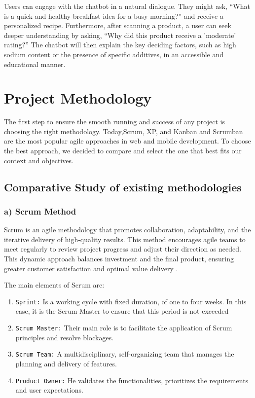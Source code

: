 Users can engage with the chatbot in a natural dialogue. They might ask, “What is a quick and healthy breakfast idea for a busy morning?” and receive a personalized recipe. Furthermore, after scanning a product, a user can seek deeper understanding by asking, “Why did this product receive a 'moderate' rating?” The chatbot will then explain the key deciding factors, such as high sodium content or the presence of specific additives, in an accessible and educational manner.


\section{Project Methodology}

The first step to ensure the smooth running and success of any project is choosing the right methodology. Today,Scrum, XP, and Kanban and  Scrumban are the most popular agile approaches in web and mobile development.
To choose the best approach, we decided to compare and select the one that best fits our context and objectives.

\subsection{Comparative Study of existing methodologies}
\subsubsection{a) Scrum Method} 
Scrum is an agile methodology that promotes collaboration, adaptability, and the iterative delivery of high-quality results. This method encourages agile teams to meet regularly to review project progress and adjust their direction as needed. This dynamic approach balances investment and the final product, ensuring greater customer satisfaction and optimal value delivery \cite{scrum2025}.

The main elements of Scrum are:
\begin{enumerate}
    \item \texttt{Sprint:} Is a working cycle with fixed duration, of one to four weeks. In this case, it is the Scrum Master to ensure that this period is not exceeded \cite{schwaber2004agile}

    \item \texttt{Scrum Master:} Their main role is to facilitate the application of Scrum principles and resolve blockages.

    \item \texttt{Scrum Team:} A multidisciplinary, self-organizing team that manages the planning and delivery of features.


    \item \texttt{Product Owner:} He validates the functionalities, prioritizes the requirements and user expectations.

    
\end{enumerate}
